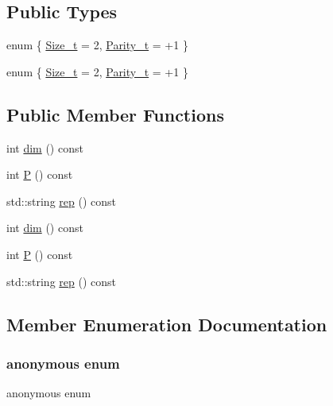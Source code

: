 \subsection*{Public Types}
\begin{DoxyCompactItemize}
\item 
enum \{ \mbox{\hyperlink{structHadron_1_1J1o2gRep_abea380da1624c25200ec9e3fc32f3b09a801645c5300c8a243540179321757326}{Size\+\_\+t}} = 2, 
\mbox{\hyperlink{structHadron_1_1J1o2gRep_abea380da1624c25200ec9e3fc32f3b09a2ee68ff7602fa008aa40b58fc24be563}{Parity\+\_\+t}} = +1
 \}
\item 
enum \{ \mbox{\hyperlink{structHadron_1_1J1o2gRep_abea380da1624c25200ec9e3fc32f3b09a801645c5300c8a243540179321757326}{Size\+\_\+t}} = 2, 
\mbox{\hyperlink{structHadron_1_1J1o2gRep_abea380da1624c25200ec9e3fc32f3b09a2ee68ff7602fa008aa40b58fc24be563}{Parity\+\_\+t}} = +1
 \}
\end{DoxyCompactItemize}
\subsection*{Public Member Functions}
\begin{DoxyCompactItemize}
\item 
int \mbox{\hyperlink{structHadron_1_1J1o2gRep_afbe3a5f8d11261126c36952b2fcac25c}{dim}} () const
\item 
int \mbox{\hyperlink{structHadron_1_1J1o2gRep_a23669238b8f2c4ecfbabacf36c40d2b3}{P}} () const
\item 
std\+::string \mbox{\hyperlink{structHadron_1_1J1o2gRep_a22d769f4159dcc0aff401a4af78dbd37}{rep}} () const
\item 
int \mbox{\hyperlink{structHadron_1_1J1o2gRep_afbe3a5f8d11261126c36952b2fcac25c}{dim}} () const
\item 
int \mbox{\hyperlink{structHadron_1_1J1o2gRep_a23669238b8f2c4ecfbabacf36c40d2b3}{P}} () const
\item 
std\+::string \mbox{\hyperlink{structHadron_1_1J1o2gRep_a22d769f4159dcc0aff401a4af78dbd37}{rep}} () const
\end{DoxyCompactItemize}


\subsection{Member Enumeration Documentation}
\mbox{\label{structHadron_1_1J1o2gRep_a87217d794c2e0351f09b30828493e0b8}} 
\subsubsection{\texorpdfstring{anonymous enum}{anonymous enum}}
{\footnotesize\ttfamily anonymous enum}

